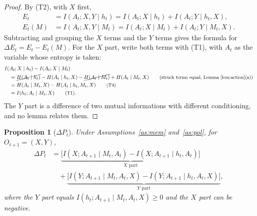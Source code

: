 \documentclass{article}
\newtheorem{proposition}{Proposition}[section]
\theoremstyle{definition}
\theoremstyle{remark}
\newcommand{\dE}{\Delta E}
\newcommand{\dP}{\Delta P}
\newcommand{\why}[1]{\tag*{\small(#1)}}
\begin{document}
\begin{proof}
By (T2), with $X$ first,
\begin{align*}
E_t&=I(A_t;X,Y\mid h_t)=I(A_t;X\mid h_t)+I(A_t;Y\mid h_t,X),\\
E_t(M)&=I(A_t;X,Y\mid M_t)=I(A_t;X\mid M_t)+I(A_t;Y\mid M_t,X).
\end{align*}
Subtracting and grouping the $X$ terms and the $Y$ terms gives the formula for $\dE_t=E_t-E_t(M)$. For the $X$ part, write both terms with (T1), with $A_t$ as the variable whose entropy is taken:
\begin{align*}
&I(A_t;X\mid h_t)-I(A_t;X\mid M_t)\\
&\quad=\cancel{H(A_t\mid h_t)}-H(A_t\mid h_t,X)-\cancel{H(A_t\mid M_t)}+H(A_t\mid M_t,X) \why{struck terms equal, Lemma~\ref{lem:action}(a)}\\
&\quad=H(A_t\mid M_t,X)-H(A_t\mid h_t,M_t,X) \why{T4}\\
&\quad=I(h_t;A_t\mid M_t,X) \why{T1}.
\end{align*}
The $Y$ part is a difference of two mutual informations with different conditioning, and no lemma relates them.
\end{proof}

\begin{proposition}[$\dP_t$]\label{prop:xy-P}
Under Assumptions~\ref{as:mem} and~\ref{as:pol}, for $O_{t+1}=(X,Y)$,
\[
\begin{aligned}
\dP_t&=\underbrace{\big[I(X;A_{t+1}\mid M_t,A_t)-I(X;A_{t+1}\mid h_t,A_t)\big]}_{X\text{ part}}\\
&\quad+\underbrace{\big[I(Y;A_{t+1}\mid M_t,A_t,X)-I(Y;A_{t+1}\mid h_t,A_t,X)\big]}_{Y\text{ part}},
\end{aligned}
\]
where the $Y$ part equals $I(h_t;A_{t+1}\mid M_t,A_t,X)\ge0$ and the $X$ part can be negative.
\end{proposition}
\end{document}

